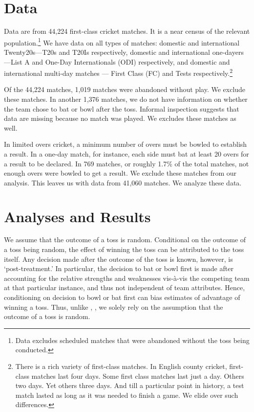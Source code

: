 \documentclass[12pt]{article}
\begin{document}
\section*{Data}
Data are from 44,224 first-class cricket matches. It is a near census of the relevant population.\footnote{Data excludes scheduled matches that were abandoned without the toss being conducted.} We have data on all types of matches: domestic and international Twenty20s---T20s and T20Is respectively, domestic and international one-dayers---List A and One-Day Internationals (ODI) respectively, and domestic and international multi-day matches --- First Class (FC) and Tests respectively.\footnote{There is a rich variety of first-class matches. In English county cricket, first-class matches last four days. Some first class matches last just a day. Others two days. Yet others three days. And till a particular point in history, a test match lasted as long as it was needed to finish a game. We elide over such differences.} 

Of the 44,224 matches, 1,019 matches were abandoned without play. We exclude these matches. In another 1,376 matches, we do not have information on whether the team chose to bat or bowl after the toss. Informal inspection suggests that data are missing because no match was played. We excludes these matches as well. 

In limited overs cricket, a minimum number of overs must be bowled to establish a result. In a one-day match, for instance, each side must bat at least 20 overs for a result to be declared. In 769 matches, or roughly 1.7\% of the total matches, not enough overs were bowled to get a result. We exclude these matches from our analysis. This leaves us with data from 41,060 matches. We analyze these data.
 
\section*{Analyses and Results}

We assume that the outcome of a toss is random. Conditional on the outcome of a toss being random, the effect of winning the toss can be attributed to the toss itself. Any decision made after the outcome of the toss is known, however, is `post-treatment.' In particular, the decision to bat or bowl first is made after accounting for the relative strengths and weaknesses vis-\`{a}-vis the competing team at that particular instance, and thus not independent of team attributes. Hence, conditioning on decision to bowl or bat first can bias estimates of advantage of winning a toss. Thus, unlike \citet{dawson2009bat}, \citet{Saad2015}, we solely rely on the assumption that the outcome of a toss is random. 
\end{document}
